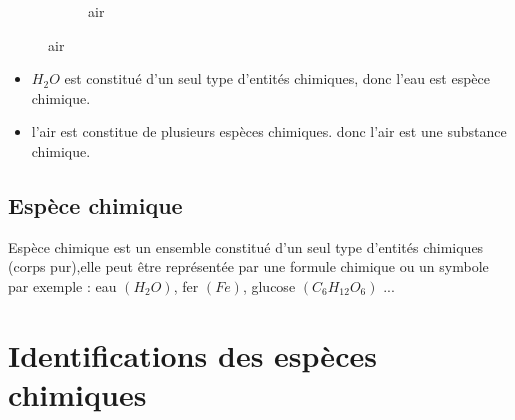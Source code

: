 \documentclass[12pt,a4paper]{book}
\begin{document}
{\begin{figure}[!h]
\begin{subfigure}{.5\textwidth}
  \caption{air}
  \label{fig:c1im1_1}
\end{subfigure}
\label{fig:c1im1_2}
\end{figure}
\begin{itemize}
\item $H_2O$ est constitué d'un seul type d'entités chimiques, donc l'eau est espèce chimique.
\item l'air est constitue de plusieurs espèces chimiques. donc l'air est une substance chimique.
\end{itemize}
\subsection{Espèce chimique}
\noindent
Espèce chimique est un ensemble constitué d'un seul type d'entités chimiques (corps pur),elle peut être représentée par une formule chimique ou un symbole par exemple : eau $(H_2O)$, fer $(Fe)$, glucose $(C_6H_{12}O_6)$ ...
\section{Identifications des espèces chimiques}
}
\end{document}
